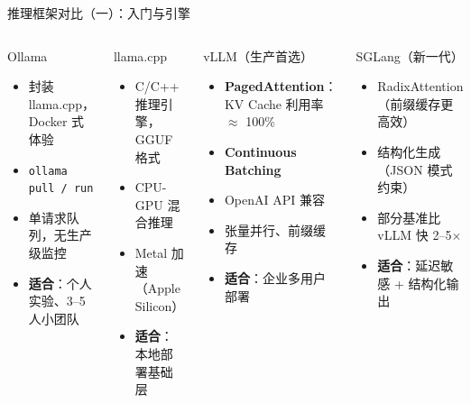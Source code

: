 \documentclass[UTF8,11pt,aspectratio=169]{beamer}
\begin{document}
\begin{frame}{推理框架对比（一）：入门与引擎}
  \begin{columns}[T]
    \begin{block}{Ollama}
      \begin{itemize}
        \item 封装 llama.cpp，Docker 式体验
        \item \texttt{ollama pull / run}
        \item 单请求队列，无生产级监控
        \item \textbf{适合}：个人实验、3--5 人小团队
      \end{itemize}
    \end{block}

    \begin{block}{llama.cpp}
      \begin{itemize}
        \item C/C++ 推理引擎，GGUF 格式
        \item CPU-GPU 混合推理
        \item Metal 加速（Apple Silicon）
        \item \textbf{适合}：本地部署基础层
      \end{itemize}
    \end{block}

    \begin{block}{vLLM（生产首选）}
      \begin{itemize}
        \item \textbf{PagedAttention}：KV Cache 利用率 $\approx$ 100\%
        \item \textbf{Continuous Batching}
        \item OpenAI API 兼容
        \item 张量并行、前缀缓存
        \item \textbf{适合}：企业多用户部署
      \end{itemize}
    \end{block}

    \begin{block}{SGLang（新一代）}
      \begin{itemize}
        \item RadixAttention（前缀缓存更高效）
        \item 结构化生成（JSON 模式约束）
        \item 部分基准比 vLLM 快 2--5$\times$
        \item \textbf{适合}：延迟敏感 + 结构化输出
      \end{itemize}
    \end{block}
  \end{columns}
\end{frame}
\end{document}
